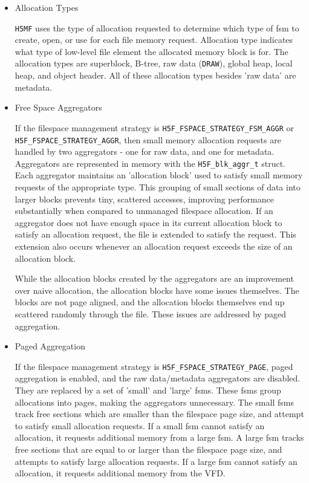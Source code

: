 \begin{itemize}

    \item Allocation Types

\texttt{H5MF} uses the type of allocation requested to determine which type of \Gls{fsm} to create, open, or use for each file memory request. Allocation type indicates what type of low-level file element the allocated memory block is for. The allocation types are superblock, B-tree, raw data (\texttt{DRAW}), global heap, local heap, and object header. All of these allocation types besides 'raw data' are metadata.

    \item Free Space Aggregators

If the filespace management strategy is \texttt{H5F\_FSPACE\_STRATEGY\_FSM\_AGGR} or \\ \texttt{H5F\_FSPACE\_STRATEGY\_AGGR}, then small memory allocation requests are handled by two aggregators - one for raw data, and one for metadata. Aggregators are represented in memory with the \texttt{H5F\_blk\_aggr\_t} struct. Each aggregator maintains an 'allocation block' used to satisfy small memory requests of the appropriate type. This grouping of small sections of data into larger blocks prevents tiny, scattered accesses, improving performance substantially when compared to unmanaged filespace allocation. If an aggregator does not have enough space in its current allocation block to satisfy an allocation request, the file is extended to satisfy the request. This extension also occurs whenever an allocation request exceeds the size of an allocation block.

While the allocation blocks created by the aggregators are an improvement over naive allocation, the allocation blocks have some issues themselves. The blocks are not page aligned, and the allocation blocks themselves end up scattered randomly through the file. These issues are addressed by paged aggregation.

    \item Paged Aggregation

If the filespace management strategy is \texttt{H5F\_FSPACE\_STRATEGY\_PAGE}, paged aggregation is enabled, and the raw data/metadata aggregators are disabled. They are replaced by a set of 'small' and 'large' \Glspl{fsm}. These \Glspl{fsm} group allocations into pages, making the aggregators unnecessary. The small \Glspl{fsm} track free sections which are smaller than the filespace page size, and attempt to satisfy small allocation requests. If a small \Gls{fsm} cannot satisfy an allocation, it requests additional memory from a large \Gls{fsm}. A large \Gls{fsm} tracks free sections that are equal to or larger than the filespace page size, and attempts to satisfy large allocation requests. If a large \Gls{fsm} cannot satisfy an allocation, it requests additional memory from the VFD.


\end{itemize}
